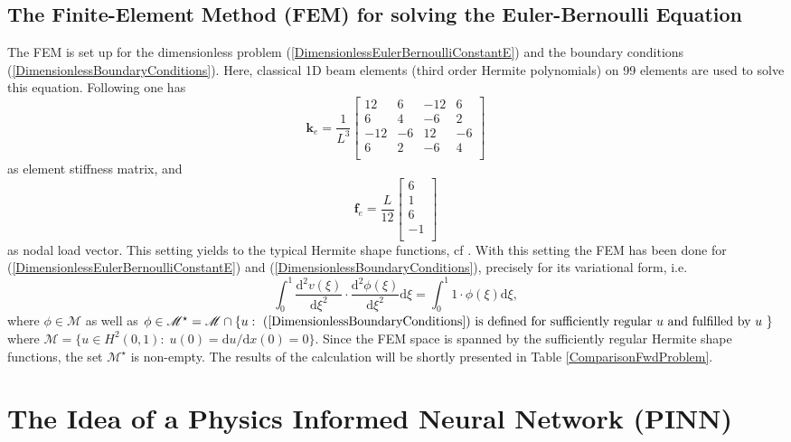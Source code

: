 \documentclass[a4paper,11pt]{article}
\begin{document}
\subsection*{The Finite-Element Method (FEM) for solving the Euler-Bernoulli Equation}
The FEM is set up for the dimensionless problem (\ref{DimensionlessEulerBernoulliConstantE}) and the boundary conditions (\ref{DimensionlessBoundaryConditions}). Here, classical 1D beam elements (third order Hermite polynomials) on 99 elements are used to solve this equation. 
Following \cite[pp. 62--69]{schwarz1991methode} one has
%
\[
\mathbf{k}_e = \frac{1}{L^3}
\begin{bmatrix}
12 & 6 & -12 & 6 \\
6 & 4 & -6 & 2 \\
-12 & -6 & 12 & -6 \\
6 & 2 & -6 & 4 \\
\end{bmatrix}
\]
as element stiffness matrix, and
\begin{equation*}
\mathbf{f}_e = \frac{L}{12}
\begin{bmatrix}
6 \\
1 \\
6 \\
-1 \\
\end{bmatrix}
\end{equation*}
%
as nodal load vector. This setting yields to the typical Hermite shape functions, cf \cite[p. 69]{schwarz1991methode}.
With this setting the FEM has been done for (\ref{DimensionlessEulerBernoulliConstantE}) and (\ref{DimensionlessBoundaryConditions}), precisely for its variational form, i.e.
\begin{equation*}
\int_0^1 \frac{\mathrm{d}^2 v(\xi)}{\mathrm{d}\xi^2} \cdot \frac{\mathrm{d}^2 \phi (\xi)}{\mathrm{d}\xi^2} \mathrm{d}\xi = \int_0^1 1 \cdot \phi (\xi) \mathrm{d}\xi ,
\end{equation*}
where $ \phi \in \mathscr{M} $ as well as  $ \phi \in \mathscr{M}^\star = \mathscr{M} \cap \{ u : \text{  (\ref{DimensionlessBoundaryConditions})  is defined for sufficiently regular $u$ and fulfilled by $u$  }\} $ where $ \mathscr{M} = \{ u \in H^2(0,1) :\; u(0) = \mathrm{d}u / \mathrm{d}x (0) = 0 \} $. Since the FEM space is spanned by the sufficiently regular Hermite shape functions, the set $ \mathscr{M}^\star $ is non-empty. The results of the calculation will be shortly presented in Table \ref{ComparisonFwdProblem}.

\section{The Idea of a Physics Informed Neural Network (PINN)}
\end{document}
